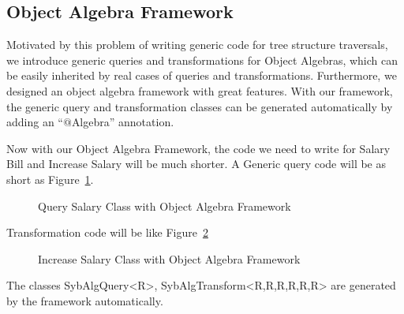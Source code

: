 \subsection{Object Algebra Framework}

Motivated by this problem of writing generic code for tree structure
traversals, we introduce generic queries and transformations for
Object Algebras, which can be easily inherited by real cases of
queries and transformations. Furthermore, we designed an object
algebra framework with great features. With our framework, the generic
query and transformation classes can be generated automatically by
adding an ``$@$Algebra'' annotation.

Now with our Object Algebra Framework, the code we need to write for
Salary Bill and Increase Salary will be much shorter. A Generic query
code will be as short as Figure~\ref{query_with_oaframework}.

\begin{figure}[tb]
\vspace{-.1in}
\caption{Query Salary Class with Object Algebra Framework}
\label{query_with_oaframework}
\end{figure}
Transformation code will be like Figure~\ref{transform_with_oaframework}
\begin{figure}[tb]
\vspace{-.1in}
\caption{Increase Salary Class with Object Algebra Framework}
\label{transform_with_oaframework}
\end{figure}
The classes SybAlgQuery<R>, SybAlgTransform<R,R,R,R,R,R> are generated
by the framework automatically. 
